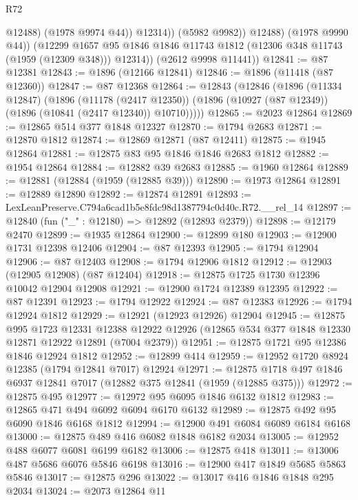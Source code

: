 \begin{lexlean}{R72}
\begin{coremodule}
                      @12488)
                    (@1978 @9974 @44))
                  @12314))
              (@5982 @9982))
            @12488)
          (@1978 @9990 @44))
        (@12299
          @1657
          @95
          @1846
          @1846
          @11743
          @1812
          (@12306 @348 @11743 (@1959 (@12309 @348)))
          @12314))
      (@2612 @9998 @11441))
@12841 := @87 @12381
@12843 := @1896 (@12166 @12841)
@12846 := @1896 (@11418 (@87 @12360))
@12847 := @87 @12368
@12864 := @12843
    (@12846
      (@1896
        (@11334 @12847)
        (@1896
          (@11178 (@2417 @12350))
          (@1896 (@10927 (@87 @12349)) (@1896 (@10841 (@2417 @12340)) @10710)))))
@12865 := @2023 @12864
@12869 := @12865 @514 @377 @1848 @12327
@12870 := @1794 @2683
@12871 := @12870 @1812
@12874 := @12869 @12871 (@87 @12411)
@12875 := @1945 @12864
@12881 := @12875 @83 @95 @1846 @1846 @2683 @1812
@12882 := @1954 @12864
@12884 := @12882 @39 @2683
@12885 := @1960 @12864
@12889 := @12881 (@12884 (@1959 (@12885 @39)))
@12890 := @1973 @12864
@12891 := @12889 @12890
@12892 := @12874 @12891
@12893 := LexLeanPreserve.C794a6cad1b5e8fdc98d1387794c0d40c.R72.__rel_14
@12897 := @12840 (fun ("_" : @12180) => @12892 (@12893 @2379))
@12898 := @12179 @2470
@12899 := @1935 @12864
@12900 := @12899 @180
@12903 := @12900 @1731 @12398 @12406
@12904 := @87 @12393
@12905 := @1794 @12904
@12906 := @87 @12403
@12908 := @1794 @12906 @1812
@12912 := @12903 (@12905 @12908) (@87 @12404)
@12918 := @12875 @1725 @1730 @12396 @10042 @12904 @12908
@12921 := @12900 @1724 @12389 @12395
@12922 := @87 @12391
@12923 := @1794 @12922
@12924 := @87 @12383
@12926 := @1794 @12924 @1812
@12929 := @12921 (@12923 @12926) @12904
@12945 := @12875
    @995
    @1723
    @12331
    @12388
    @12922
    @12926
    (@12865 @534 @377 @1848 @12330 @12871 @12922 @12891 (@7004 @2379))
@12951 := @12875 @1721 @95 @12386 @1846 @12924 @1812
@12952 := @12899 @414
@12959 := @12952 @1720 @8924 @12385 (@1794 @12841 @7017) @12924
@12971 := @12875 @1718 @497 @1846 @6937 @12841 @7017 (@12882 @375 @12841 (@1959 (@12885 @375)))
@12972 := @12875 @495
@12977 := @12972 @95 @6095 @1846 @6132 @1812
@12983 := @12865 @471 @494 @6092 @6094 @6170 @6132
@12989 := @12875 @492 @95 @6090 @1846 @6168 @1812
@12994 := @12900 @491 @6084 @6089 @6184 @6168
@13000 := @12875 @489 @416 @6082 @1848 @6182 @2034
@13005 := @12952 @488 @6077 @6081 @6199 @6182
@13006 := @12875 @418
@13011 := @13006 @487 @5686 @6076 @5846 @6198
@13016 := @12900 @417 @1849 @5685 @5863 @5846
@13017 := @12875 @296
@13022 := @13017 @416 @1846 @1848 @295 @2034
@13024 := @2073 @12864 @11

\end{coremodule}
\end{lexlean}
